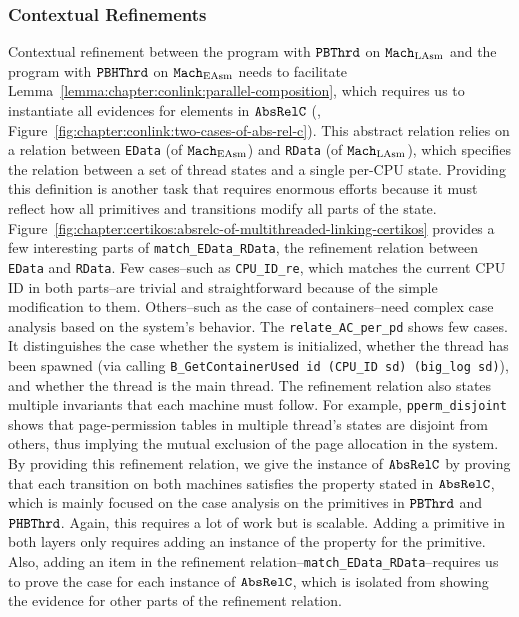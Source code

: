 \subsubsection{Contextual Refinements}
Contextual refinement between the program with ${{\mathrm{\texttt{PBThrd}}}}$ on ${\mathrm{\texttt{Mach}}}_{\mathrm{LAsm}}$ and 
 the program with ${\mathrm{\texttt{PBHThrd}}}$ on ${\mathrm{\texttt{Mach}}}_{\mathrm{EAsm}}$
 needs to facilitate Lemma~\ref{lemma:chapter:conlink:parallel-composition}, 
 which requires us to instantiate all evidences for elements in ${{\mathrm{\texttt{AbsRelC}}}}$ (\eg, 
 Figure~\ref{fig:chapter:conlink:two-cases-of-abs-rel-c}).
This abstract relation relies on a relation between  \lstinline$EData$ (of ${\mathrm{\texttt{Mach}}}_{\mathrm{EAsm}}$) and \lstinline$RData$ (of ${\mathrm{\texttt{Mach}}}_{\mathrm{LAsm}}$),
which specifies the relation between a set of thread states and a single per-CPU state. 
Providing this definition is another task that requires enormous efforts 
because it must reflect how
all primitives and transitions modify all parts of the state.
Figure~\ref{fig:chapter:certikos:absrelc-of-multithreaded-linking-certikos} provides
a few interesting parts of  \lstinline$match_EData_RData$, the refinement relation between \lstinline$EData$ and  \lstinline$RData$.
Few cases--such as \lstinline$CPU_ID_re$, which matches the current CPU ID in both parts--are trivial and straightforward because of the simple modification to them. 
Others--such as the case of containers--need complex case analysis based on the system's behavior. 
The \lstinline$relate_AC_per_pd$ shows few cases.
It distinguishes the case whether the system is initialized, whether the thread has been
spawned (via calling \lstinline$B_GetContainerUsed id (CPU_ID sd) (big_log sd)$),
and whether the thread is the main thread.
The refinement relation also states multiple invariants
that each machine must follow.
For example, \lstinline$pperm_disjoint$ shows
that page-permission tables in multiple thread's states are disjoint from others, thus implying
the mutual exclusion of the page allocation in the system. 
By providing this refinement relation,
we give the instance of ${{\mathrm{\texttt{AbsRelC}}}}$ by proving 
that each transition on both machines satisfies the property stated in ${{\mathrm{\texttt{AbsRelC}}}}$,
which is mainly focused on the case analysis on the primitives in  ${{\mathrm{\texttt{PBThrd}}}}$ and ${{\mathrm{\texttt{PHBThrd}}}}$.
Again, this requires a lot of work but is scalable.
Adding a primitive in both layers only requires adding an instance of the property for the primitive.
Also, adding an item in the refinement relation--\lstinline$match_EData_RData$--requires 
us to prove the case for each instance of ${{\mathrm{\texttt{AbsRelC}}}}$,
which is isolated from showing the evidence for other parts of the refinement relation.

